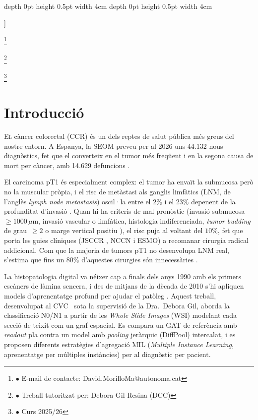 \documentclass[10pt,a4paper,twocolumn,twoside]{article}
\newcommand\blfootnote[1]{%
  \begingroup
  \renewcommand\thefootnote{}\footnote{#1}%
  \addtocounter{footnote}{-1}%
  \endgroup
}
\begin{document}
\begin{@twocolumnfalse}
\begin{center}
\bigskip

{\vrule depth 0pt height 0.5pt width 4cm\hspace{7.5pt}%
%
\hspace{7.5pt}\vrule depth 0pt height 0.5pt width 4cm\relax}

\end{center}

\bigskip
\end{@twocolumnfalse}]

\blfootnote{$\bullet$ E-mail de contacte: David.MorilloMa@autonoma.cat}
\blfootnote{$\bullet$ Treball tutoritzat per: Debora Gil Resina (DCC)} \blfootnote{$\bullet$ Curs 2025/26}

\section{Introducció}

\lettrine[lines=3]{E}{l} càncer colorectal (CCR) és un dels reptes de salut pública més greus del nostre
entorn. A Espanya, la SEOM preveu per al 2026 uns 44.132 nous diagnòstics, fet que el converteix en el tumor
més freqüent i en la segona causa de mort per càncer, amb 14.629 defuncions \cite{seom2026}.

El carcinoma pT1 és especialment complex: el tumor ha envaït la submucosa però no la muscular pròpia, i el risc de
metàstasi als ganglis limfàtics (LNM, de l'anglès \textit{lymph node metastasis}) oscil·la entre el
$2\%$ i el $23\%$ depenent de la profunditat
d'invasió \cite{ParcSalutMar2013}. %
Quan hi ha criteris de mal pronòstic (invasió submucosa $\geq\!1000\,\mu$m,
invasió vascular o limfàtica, histologia indiferenciada, \textit{tumor budding} de
grau~$\geq\!2$ o marge vertical positiu \cite{jsccr2019,dawson2024budding}), el risc puja
al voltant del $10\%$, fet que porta les guies clíniques (JSCCR \cite{jsccr2019}, NCCN i
ESMO) a recomanar cirurgia radical addicional. Com que la majoria de tumors
pT1 no desenvolupa LNM real, s'estima que fins un $80\%$ d'aquestes cirurgies són
innecessàries \cite{zaffalon2023,MartinezDeJuan2024}.

La histopatologia digital va néixer cap a finals dels anys 1990 amb els primers escàners
de làmina sencera, i des de mitjans de la dècada de 2010 s'hi apliquen models
d'aprenentatge profund per ajudar el patòleg \cite{bejnordi2017camelyon}. Aquest treball,
desenvolupat al CVC~\cite{cvc} sota la supervisió de la Dra.\ Debora Gil, aborda la
classificació N0/N1 a partir de les \textit{Whole Slide Images} (WSI) modelant cada secció
de teixit com un graf espacial. Es compara un GAT de referència amb \textit{readout}
pla contra un model amb \textit{pooling} jeràrquic (DiffPool) intercalat, i es proposen
diferents estratègies d'agregació MIL (\textit{Multiple Instance Learning}, aprenentatge per
múltiples instàncies) per al diagnòstic per pacient.
\end{document}
